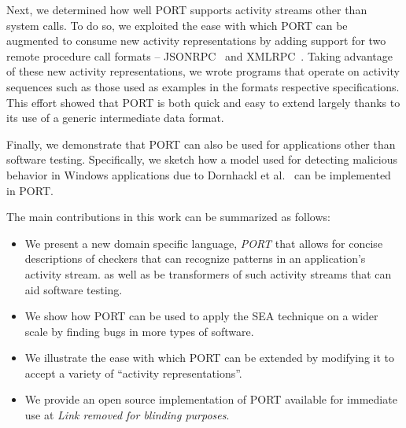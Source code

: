 Next, we
determined how well PORT
supports activity streams
other than system calls.
To do so,
we exploited the ease with which
PORT can be augmented
to consume new activity representations
by adding support for two remote procedure call formats --
JSONRPC~\cite{jsonspec} and XMLRPC~\cite{xmlspec}.
Taking advantage of these new activity representations,
we wrote programs that operate on activity sequences such as those
used as examples in the formats respective specifications.
This effort
showed that PORT is both quick and easy to extend largely thanks to its
use of a generic intermediate data format.

Finally, we demonstrate that PORT can also be used for applications other than software testing.
Specifically, we sketch how a model used for
detecting malicious behavior in Windows applications due to Dornhackl et al.~\cite{Dornhackl2014} can be implemented in PORT.


The main contributions in this work can be summarized as follows:

\begin{itemize}

\item We present a new domain specific language, {\em PORT}
  that allows for concise descriptions of checkers that can recognize patterns in
  an application's activity stream. as well as be transformers of such activity streams that can aid software testing.

\item We show how PORT can be used to  apply the SEA technique on a wider scale by finding bugs in more types of software.

\item We illustrate the ease with which PORT can be extended by modifying
  it to accept a variety of ``activity representations''.
  
\item We provide an open source implementation of PORT available for immediate use
at \textit{Link removed for blinding purposes}.

\end{itemize}


